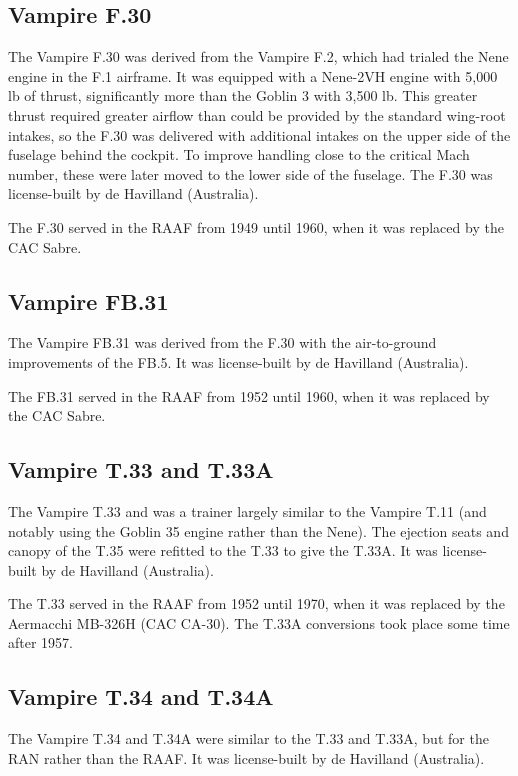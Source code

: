 \subsection{Vampire F.30}

The Vampire F.30 was derived from the Vampire F.2, which had trialed the Nene engine in the F.1 airframe. It was equipped with a Nene-2VH engine with 5,000 lb of thrust, significantly more than the Goblin 3 with 3,500 lb. This greater thrust required greater airflow than could be provided by the standard wing-root intakes, so the F.30 was delivered with additional intakes on the upper side of the fuselage behind the cockpit. To improve handling close to the critical Mach number, these were later moved to the lower side of the fuselage. The F.30 was license-built by de Havilland (Australia).

The F.30 served in the RAAF from 1949 until 1960, when it was replaced by the CAC Sabre.

\subsection{Vampire FB.31}

The Vampire FB.31 was derived from the F.30 with the air-to-ground improvements of the FB.5. It was license-built by de Havilland (Australia).

The FB.31 served in the RAAF from 1952 until 1960, when it was replaced by the CAC Sabre.

\subsection{Vampire T.33 and T.33A}

The Vampire T.33 and was a trainer largely similar to the Vampire T.11 (and notably using the Goblin 35 engine rather than the Nene). The ejection seats and canopy of the T.35 were refitted to the T.33 to give the T.33A. It was license-built by de Havilland (Australia).

The T.33 served in the RAAF from 1952 until 1970, when it was replaced by the Aermacchi MB-326H (CAC CA-30). The T.33A conversions took place some time after 1957.

\subsection{Vampire T.34 and T.34A}

The Vampire T.34 and T.34A were similar to the T.33 and T.33A, but for the RAN rather than the RAAF. It was license-built by de Havilland (Australia).

